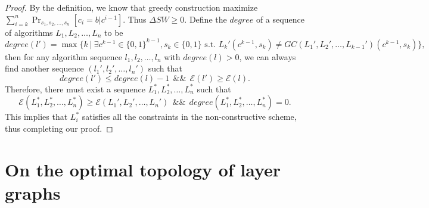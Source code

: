 \documentclass[a4paper,UKenglish]{lipics}
\theoremstyle{definition}
\begin{document}
\begin{proof}
By the definition, we know that greedy construction maximize $\sum_{i=k}^n \Pr_{s_1, s_2, \dots, s_n} [c_i = b|c^{i-1}]$. 
Thus $\Delta SW \geq 0$.
Define the $degree$ of a sequence of algorithms $L_1, L_2, \dots, L_n$ to be
\begin{equation*}
	degree(l') 
= 
	\max \Big\{ k 
		~ \Big| ~ 
			\exists c^{k-1} \in \{0,1\}^{k-1}, s_k \in \{0,1\} \text{ s.t. } 
			L_k'(c^{k-1}, s_k) \not= GC(L_1', L_2', \dots, L_{k-1}')(c^{k-1}, s_k)
		\Big\},
\end{equation*}
then for any algorithm sequence $l_1, l_2, \dots, l_n$ with $degree(l)>0$, we can always find another sequence $(l_1', l_2', \dots, l_n')$ such that 
\begin{equation*}
degree(l') \leq degree(l) - 1~~ \&\&~~ \mathcal{E}(l')\geq \mathcal{E}(l).
\end{equation*}
Therefore, there must exist a sequence $L_1^*, L_2^*, \dots, L_n^*$ such that 
\begin{equation*}
\mathcal{E}(L_1^*, L_2^*, \dots, L_n^*) \geq \mathcal{E}(L_1', L_2', \dots, L_n')
~~\&\&~~
degree(L_1^*, L_2^*, \dots, L_n^*) = 0.
\end{equation*}
This implies that $L_i^*$ satisfies all the constraints in the non-constructive scheme, thus completing our proof.
\end{proof}









\section{On the optimal topology of layer graphs}
\end{document}
